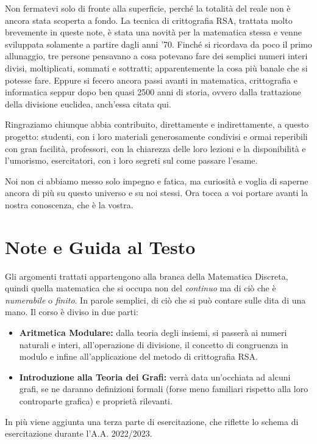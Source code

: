 \documentclass[oneside]{book}
\theoremstyle{remark}
\begin{document}
Non fermatevi solo di fronte alla superficie, perché la totalità del reale non è ancora
stata scoperta a fondo. La tecnica di crittografia RSA, trattata molto
brevemente in queste note, è stata una novità per la matematica
stessa e venne sviluppata solamente a partire dagli anni '70. Finché si ricordava
da poco il primo allunaggio, tre persone pensavano a cosa potevano fare
dei semplici numeri interi divisi, moltiplicati, sommati e sottratti;
apparentemente la cosa più banale che si potesse fare. Eppure si fecero
ancora passi avanti in matematica, crittografia e informatica seppur dopo
ben quasi 2500 anni di storia, ovvero dalla trattazione della divisione
euclidea, anch'essa citata qui.

Ringraziamo chiunque abbia contribuito, direttamente e indirettamente,
a questo progetto: studenti, con i loro materiali generosamente condivisi
e ormai reperibili con gran facilità, professori, con la chiarezza delle
loro lezioni e la disponibilità e l'umorismo, esercitatori, con i loro
segreti sul come passare l'esame.

Noi non ci abbiamo messo solo impegno e fatica, ma curiosità e voglia di
saperne ancora di più su questo universo e su noi stessi. Ora tocca a voi
portare avanti la nostra conoscenza, che è la vostra.


\chapter*{Note e Guida al Testo}
Gli argomenti trattati appartengono alla branca della Matematica Discreta,
quindi quella matematica che si occupa non del \textit{continuo} ma di
ciò che è \textit{numerabile} o \textit{finito}. In parole
semplici, di ciò che si può contare sulle dita di una mano. Il corso
è diviso in due parti:
\begin{itemize}
\item \textbf{Aritmetica Modulare:} dalla teoria degli insiemi,
si passerà ai numeri naturali e interi, all'operazione di divisione,
il concetto di congruenza in modulo e infine all'applicazione
del metodo di crittografia RSA.

\item \textbf{Introduzione alla Teoria dei Grafi:} verrà data un'occhiata
ad alcuni grafi, se ne daranno definizioni formali (forse meno familiari
rispetto alla loro controparte grafica) e proprietà rilevanti.
\end{itemize}
In più viene aggiunta una terza parte di esercitazione, che riflette
lo schema di esercitazione durante l'A.A. 2022/2023.
\end{document}
